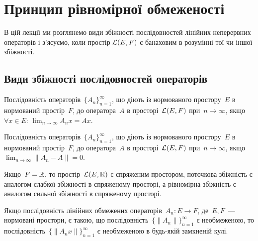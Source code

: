 \chapter{Принцип рівномірної обмеженості}

В цій лекції ми розглянемо види збіжності послідовностей
лінійних неперервних операторів і з’ясуємо, коли простір
$\mathcal{L}(E, F)$ є банаховим в розумінні тої чи іншої збіжності.

\section{Види збіжності послідовностей операторів}

\begin{definition}
Послідовність операторів~$\{A_n\}_{n = 1}^\infty$, що діють із
нормованого простору~$E$ в нормований простір~$F$,
 до оператора~$A$ в просторі~$\mathcal{L}(E, F)$
при~$n \to \infty$, якщо~$\forall x \in E$: $\lim_{n \to \infty} A_n x = A x$.
\end{definition}

\begin{definition}
Послідовність операторів~$\{A_n\}_{n = 1}^\infty$, що діють із
нормованого простору~$E$ в нормований простір~$F$,
 до оператора~$A$ в просторі~$\mathcal{L}(E, F)$
при~$n \to \infty$, якщо~$\lim_{n \to \infty} \|A_n - A\| = 0$.
\end{definition}

\begin{remark}
Якщо~$F = \mathbb{R}$, то простір~$\mathcal{L}(E, \mathbb{R})$ є
спряженим простором, поточкова збіжність є аналогом
слабкої збіжності в спряженому просторі, а рівномірна
збіжність є аналогом сильної збіжності в спряженому
просторі.
\end{remark}

\begin{lemma}
Якщо послідовність лінійних обмежених
операторів~$A_n: E \to F$, де~$E, F$~--- нормовані простори, є
такою, що послідовність~$\{\|A_n\|\}_{n = 1}^\infty$
є необмеженою, то послідовність~$\{\|A_n x\|\}_{n = 1}^\infty$
є необмеженою в будь-якій замкненій кулі.
\end{lemma}


